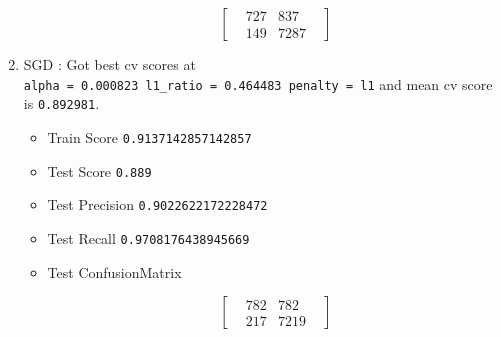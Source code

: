 \documentclass[11pt]{article}
\providecommand{\tightlist}{%
      \setlength{\itemsep}{0pt}\setlength{\parskip}{0pt}}
\begin{document}
\begin{enumerate}
\begin{itemize}
    \begin{equation}
    \begin{bmatrix}
    & 727 & 837 &  \\
    & 149 & 7287 & 
    \end{bmatrix}
    \end{equation}
  \end{itemize}
\item
  SGD : Got best cv scores at
  \texttt{alpha\ =\ 0.000823\ l1\_ratio\ =\ 0.464483\ penalty\ =\ l1}
  and mean cv score is \texttt{0.892981}.

  \begin{itemize}
  \tightlist
  \item
    Train Score \texttt{0.9137142857142857}
  \item
    Test Score \texttt{0.889}
  \item
    Test Precision \texttt{0.9022622172228472}
  \item
    Test Recall \texttt{0.9708176438945669}
  \item
    Test ConfusionMatrix

    \begin{equation}
    \begin{bmatrix}
    & 782 & 782 &  \\
    & 217 & 7219 & 
    \end{bmatrix}
    \end{equation}
  \end{itemize}
\end{enumerate}


    
    
    
    
\end{document}
